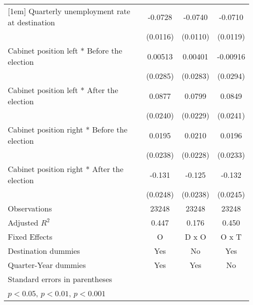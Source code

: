 \begin{table}[htbp]
\begin{tabular}{l*{3}{c}}
[1em]
Quarterly unemployment rate at destination&     -0.0728\sym{***}&     -0.0740\sym{***}&     -0.0710\sym{***}\\
                    &    (0.0116)         &    (0.0110)         &    (0.0119)         \\
[1em]
Cabinet position left * Before the election&     0.00513         &     0.00401         &    -0.00916         \\
                    &    (0.0285)         &    (0.0283)         &    (0.0294)         \\
[1em]
Cabinet position left * After the election&      0.0877\sym{***}&      0.0799\sym{**} &      0.0849\sym{***}\\
                    &    (0.0240)         &    (0.0229)         &    (0.0241)         \\
[1em]
Cabinet position right * Before the election&      0.0195         &      0.0210         &      0.0196         \\
                    &    (0.0238)         &    (0.0228)         &    (0.0233)         \\
[1em]
Cabinet position right * After the election&      -0.131\sym{***}&      -0.125\sym{***}&      -0.132\sym{***}\\
                    &    (0.0248)         &    (0.0238)         &    (0.0245)         \\
\hline
Observations        &       23248         &       23248         &       23248         \\
Adjusted \(R^{2}\)  &       0.447         &       0.176         &       0.450         \\
Fixed Effects       &           O         &       D x O         &       O x T         \\
Destination dummies &         Yes         &          No         &         Yes         \\
Quarter-Year dummies&         Yes         &         Yes         &          No         \\
\hline\hline
\multicolumn{4}{l}{\footnotesize Standard errors in parentheses}\\
\multicolumn{4}{l}{\footnotesize \sym{*} \(p<0.05\), \sym{**} \(p<0.01\), \sym{***} \(p<0.001\)}\\
\end{tabular}
\end{table}
